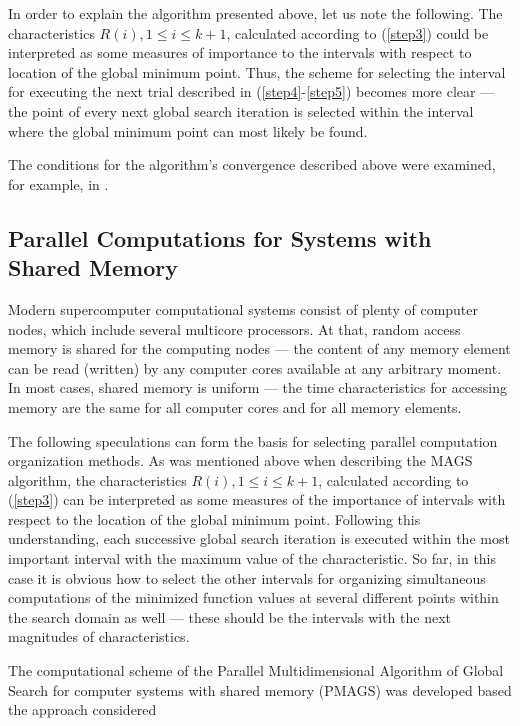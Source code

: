 \documentclass{gOMS2e}
\theoremstyle{plain}%
\theoremstyle{definition}
\theoremstyle{remark}
\begin{document}
\par
In order to explain the algorithm presented above, let us note the following.
The characteristics \(R(i), 1\leqslant i\leqslant k+1\), calculated according to (\ref{step3})
could be interpreted as some measures of importance to the intervals with respect to
location of the global minimum point. Thus, the scheme for selecting the interval
for executing the next trial described in (\ref{step4}-\ref{step5}) becomes more clear --- the point of every next
global search iteration is selected within the interval where the global minimum point can most likely be found.
\par
The conditions for the algorithm’s convergence described above were examined, for example, in \cite{strSergGO}.

\subsection{Parallel Computations for Systems with Shared Memory}
\label{subsec:sharedpar}
Modern supercomputer computational systems consist of plenty of computer nodes,
which include several multicore processors. At that, random access memory is
shared for the computing nodes --- the content of any memory element can be read (written)
by any computer cores available at any arbitrary moment. In most cases, shared memory is
uniform --- the time characteristics for accessing memory are the same for all computer
cores and for all memory elements.
\par
The following speculations can form the basis for selecting parallel computation
organization methods. As was mentioned above when describing the MAGS algorithm,
the characteristics \(R(i),1\leqslant i\leqslant k+1\), calculated according to (\ref{step3})
can be interpreted as some measures of the importance of intervals with respect to the location of
the global minimum point. Following this understanding, each successive global search
iteration is executed within the most important interval with the maximum value of the
characteristic. So far, in this case it is obvious how to select the other intervals for
organizing simultaneous computations of the minimized function values at several different
points within the search domain as well --- these should be the intervals with the next
magnitudes of characteristics.
\par
The computational scheme of the Parallel Multidimensional Algorithm of Global Search for
computer systems with shared memory (PMAGS) was developed based the approach considered
\end{document}
